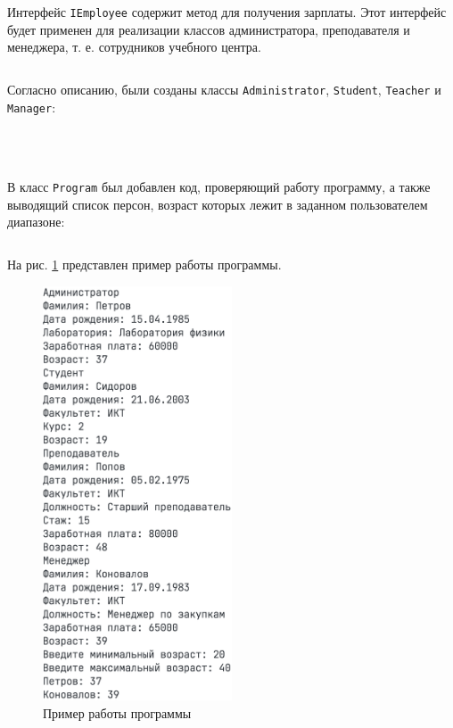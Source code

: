 \documentclass[a4paper,14pt]{extarticle}
\numberwithin{figure}{section}
\begin{document}
\inputminted{csharp}{../LearningCenter/Person.cs}

Интерфейс \texttt{IEmployee} содержит метод для получения зарплаты. Этот интерфейс будет применен для реализации классов администратора, преподавателя и менеджера, т. е. сотрудников учебного центра.

\inputminted{csharp}{../LearningCenter/IEmployee.cs}

Согласно описанию, были созданы классы \texttt{Administrator}, \texttt{Student}, \texttt{Teacher} и \texttt{Manager}:

\inputminted{csharp}{../LearningCenter/Administrator.cs}

\inputminted{csharp}{../LearningCenter/Student.cs}

\inputminted{csharp}{../LearningCenter/Teacher.cs}

\inputminted{csharp}{../LearningCenter/Manager.cs}

В класс \texttt{Program} был добавлен код, проверяющий работу программу, а также выводящий список персон, возраст которых лежит в заданном пользователем диапазоне:

\inputminted{csharp}{../LearningCenter/Program.cs}

На рис. \ref{fig:task-4} представлен пример работы программы.

\begin{figure}[H]
    \centering
    \includegraphics[width=0.5\textwidth]{images/task-4.png}
    \caption{Пример работы программы}
    \label{fig:task-4}
\end{figure}
\end{document}
